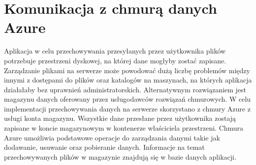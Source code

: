 \section{Komunikacja z chmurą danych Azure}
{
Aplikacja w celu przechowywania przesyłanych przez użytkownika plików potrzebuje przestrzeni dyskowej, na której dane mogłyby zostać zapisane. Zarządzanie plikami na serwerze może powodować dużą liczbę problemów między innymi z dostępami do plików oraz katalogów na maszynach, na których aplikacja działałaby bez uprawnień administratorskich. Alternatywnym rozwiązaniem jest magazynu danych oferowany przez usługodawców rozwiązań chmurowych. W celu implementacji przechowywania danych na serwerze skorzystano z chmury Azure z usługi konta magazynu. Wszystkie dane przesłane przez użytkownika zostają zapisane w koncie magazynowym w kontenerze właściciela przestrzeni. Chmura Azure umożliwia podstawowe operacje do zarządzania danymi takie jak dodawanie, usuwanie oraz pobieranie danych. Informacje na temat przechowywanych plików w magazynie znajdują się w bazie danych aplikacji.
}